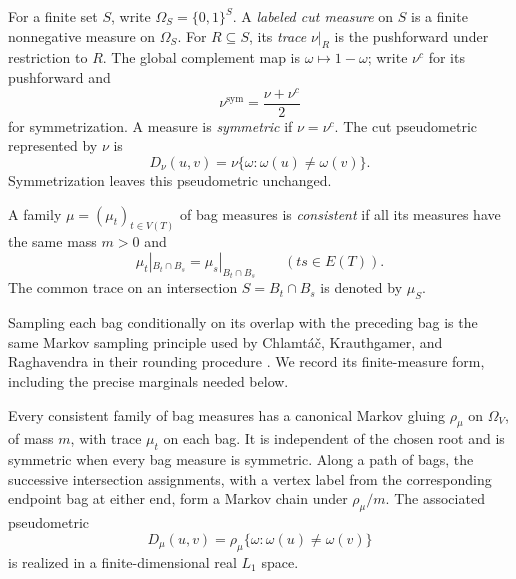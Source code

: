 For a finite set $S$, write $\Omega_S=\{0,1\}^S$.
A \emph{labeled cut measure} on $S$ is a finite nonnegative measure on
$\Omega_S$. For $R\subseteq S$, its \emph{trace} $\nu|_R$ is the
pushforward under restriction to $R$.
The global complement map is $\omega\mapsto 1-\omega$; write $\nu^c$ for
its pushforward and
\[
 \nu^{\mathrm{sym}}=\frac{\nu+\nu^c}{2}
\]
for symmetrization. A measure is \emph{symmetric} if $\nu=\nu^c$.
The cut pseudometric represented by $\nu$ is
\begin{equation}\label{eq:cut-metric}
 D_\nu(u,v)=\nu\{\omega:\omega(u)\ne\omega(v)\}.
\end{equation}
Symmetrization leaves this pseudometric unchanged.

A family $\mu=(\mu_t)_{t\in V(T)}$ of bag measures is
\emph{consistent} if all its measures have the same mass $m>0$ and
\[
 \mu_t|_{B_t\cap B_s}=\mu_s|_{B_t\cap B_s}
 \qquad(ts\in E(T)).
\]
The common trace on an intersection $S=B_t\cap B_s$ is denoted by
$\mu_S$.

Sampling each bag conditionally on its overlap with the preceding bag
is the same Markov sampling principle used by Chlamt\'a\v{c},
Krauthgamer, and Raghavendra in their rounding procedure
\cite[Section~3.2, Lemmas~3.3--3.4]{CKR}.  We record its finite-measure
form, including the precise marginals needed below.

\begin{lemma}\label{lem:gluing}
Every consistent family of bag measures has a canonical Markov gluing
$\rho_\mu$ on $\Omega_V$, of mass $m$, with trace $\mu_t$ on each bag.
It is independent of the chosen root and is symmetric when every bag
measure is symmetric.
Along a path of bags, the successive intersection assignments, with a
vertex label from the corresponding endpoint bag at either end, form
a Markov chain under $\rho_\mu/m$.
The associated pseudometric
\[
 D_\mu(u,v)=\rho_\mu\{\omega:\omega(u)\ne\omega(v)\}
\]
is realized in a finite-dimensional real $L_1$ space.
\end{lemma}

